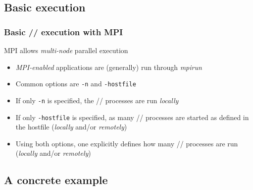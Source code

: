 \documentclass{beamer}
\begin{document}
\subsection{Basic execution}
\begin{frame}
  \frametitle{Basic // execution with MPI}

  \begin{block}{MPI allows \emph{multi-node} parallel execution}
       \begin{itemize}
        \item \emph{MPI-enabled} applications are (generally) run through \emph{mpirun}
          \begin{cmdline}
          \end{cmdline}
        \pause
        \item Common options are \texttt{-n} and \texttt{-hostfile}
        \begin{cmdline}
              
	      
        \end{cmdline}
        \pause
        \item If only \texttt{-n} is specified, the // processes are run \emph{locally}
        \pause
        \item If only \texttt{-hostfile} is specified, as many // processes are started as defined in the hostfile (\emph{locally} and/or \emph{remotely})
        \pause
        \item Using both options, one explicitly defines how many // processes are run (\emph{locally} and/or \emph{remotely})
      \end{itemize}
  \vspace{-2ex}
  \end{block}

\end{frame}


\subsection{A concrete example}
\end{document}
